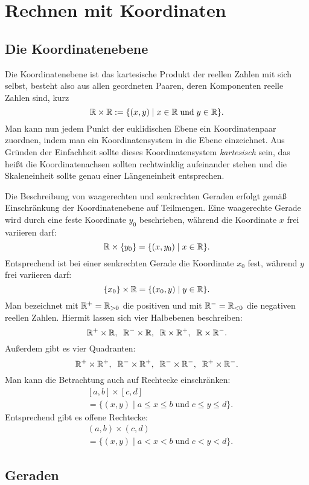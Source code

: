 \section{Rechnen mit Koordinaten}
\subsection{Die Koordinatenebene}

Die Koordinatenebene ist das kartesische Produkt der reellen
Zahlen mit sich selbst, besteht also aus allen geordneten Paaren,
deren Komponenten reelle Zahlen sind, kurz%
\[\mathbb R\times\mathbb R := \{(x,y)\mid x\in\mathbb R\;\text{und}\;y\in\mathbb R\}.\]
Man kann nun jedem Punkt der euklidischen Ebene ein Koordinatenpaar
zuordnen, indem man ein Koordinatensystem in die Ebene einzeichnet.
Aus Gründen der Einfachheit sollte dieses Koordinatensystem
\emph{kartesisch} sein, das heißt die Koordinatenachsen sollten
rechtwinklig aufeinander stehen und die Skaleneinheit sollte genau
einer Längeneinheit entsprechen.

Die Beschreibung von waagerechten und senkrechten Geraden
erfolgt gemäß Einschränkung der Koordinatenebene auf Teilmengen.
Eine waagerechte Gerade wird durch eine feste Koordinate $y_0$
beschrieben, während die Koordinate $x$ frei variieren darf:%
\[\mathbb R\times\{y_0\} = \{(x,y_0)\mid x\in\mathbb R\}.\]
Entsprechend ist bei einer senkrechten Gerade die Koordinate
$x_0$ fest, während $y$ frei variieren darf:%
\[\{x_0\}\times\mathbb R = \{(x_0,y)\mid y\in\mathbb R\}.\]
Man bezeichnet mit $\mathbb R^+ = \mathbb R_{>0}$ die positiven und mit
$\mathbb R^- = \mathbb R_{<0}$ die negativen reellen Zahlen. Hiermit lassen
sich vier Halbebenen beschreiben:%
\[\mathbb R^+\times\mathbb R,\;\; \mathbb R^-\times\mathbb R,\;\; \mathbb R\times\mathbb R^+,\;\; \mathbb R\times\mathbb R^-.\]
Außerdem gibt es vier Quadranten:
\[\mathbb R^+\times\mathbb R^+,\;\; \mathbb R^-\times\mathbb R^+,\;\; \mathbb R^-\times\mathbb R^-,\;\; \mathbb R^+\times\mathbb R^-.\]
Man kann die Betrachtung auch auf Rechtecke einschränken:%
\[\begin{split}
&[a,b]\times [c,d]\\
&= \{(x,y)\mid a\le x\le b\;\mathrm{und}\;c\le y\le d\}.
\end{split}\]
Entsprechend gibt es offene Rechtecke:
\[\begin{split}
&(a,b)\times (c,d)\\
&= \{(x,y)\mid a<x<b\;\mathrm{und}\;c<y<d\}.
\end{split}\]

\subsection{Geraden}

